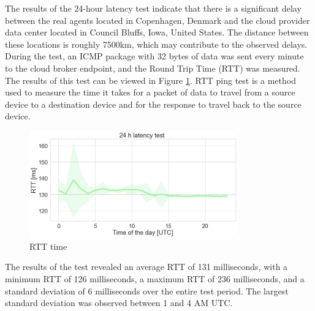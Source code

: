 The results of the 24-hour latency test indicate that there is a significant delay between the real agents located in Copenhagen, Denmark and the cloud provider data center located in Council Bluffs, Iowa, United States. The distance between these locations is roughly 7500km, which may contribute to the observed delays. During the test, an ICMP package with 32 bytes of data was sent every minute to the cloud broker endpoint, and the Round Trip Time (RTT) was measured. The results of this test can be viewed in Figure \ref{fig:ping}. RTT ping test is a method used to measure the time it takes for a packet of data to travel from a source device to a destination device and for the response to travel back to the source device.

\begin{figure}[H]
    \centering
    \includegraphics[width=0.8\textwidth]{pictures/ping.png}
    \caption{RTT time}
    \label{fig:ping}
\end{figure}

The results of the test revealed an average RTT of 131 milliseconds, with a minimum RTT of 126 milliseconds, a maximum RTT of 236 milliseconds, and a standard deviation of 6 milliseconds over the entire test period. The largest standard deviation was observed between 1 and 4 AM UTC.